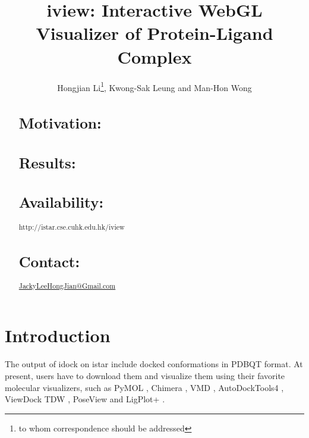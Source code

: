 \documentclass{bioinfo}
\begin{document}

\title[iview]{iview: Interactive WebGL Visualizer of Protein-Ligand Complex}
\author[Hongjian Li \textit{et~al}]{Hongjian Li\footnote{to whom correspondence should be addressed}, Kwong-Sak Leung and Man-Hon Wong}
\address{Department of Computer Science and Engineering, Chinese University of Hong Kong, Shatin, New Territories, Hong Kong, China}



\maketitle

\begin{abstract}

\section{Motivation:}

\section{Results:}

\section{Availability:}
http://istar.cse.cuhk.edu.hk/iview

\section{Contact:} \href{JackyLeeHongJian@Gmail.com}{JackyLeeHongJian@Gmail.com}
\end{abstract}

\section{Introduction}

The output of idock on istar include docked conformations in PDBQT format. At present, users have to download them and visualize them using their favorite molecular visualizers, such as PyMOL \citep{1221}, Chimera \citep{1219}, VMD \citep{1220}, AutoDockTools4 \citep{596}, ViewDock TDW \citep{559}, PoseView \citep{748} and LigPlot+ \citep{951}.
\end{document}
